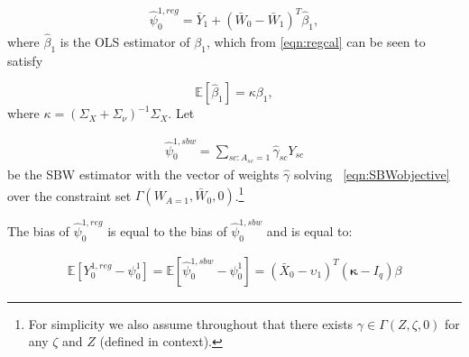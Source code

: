 \begin{align*}
\hat{\psi}^{1, reg}_0 = \bar{Y}_1 + (\bar{W}_0 - \bar{W}_1)^T\hat{\beta}_1,
\end{align*}
%
where $\hat{\beta}_1$ is the OLS estimator of $\beta_1$, which from \eqref{eqn:regcal} can be seen to satisfy \citep{gleser1992importance}

\begin{equation*}
    \mathbb{E}[\hat{\beta}_1] = \kappa \beta_1,
\end{equation*}
where $\kappa = (\Sigma_{X} + \Sigma_{\nu})^{-1} \Sigma_{X}.$ Let 

\begin{align*}
\hat{\psi}^{1, sbw}_0 = \sum_{sc: A_{sc} = 1} \hat{\gamma}_{sc} Y_{sc}
\end{align*}
%
be the SBW estimator with the vector of weights $\hat{\gamma}$ solving ~\eqref{eqn:SBWobjective} over the constraint set $\Gamma(W_{A=1}, \bar{W}_0, 0)$.\footnote{For simplicity we also assume throughout that there exists $\gamma \in \Gamma(Z, \zeta, 0)$ for any $\zeta$ and $Z$ (defined in context).}

\begin{proposition}\label{cl1}
The bias of $\hat{\psi}^{1, reg}_0$ is equal to the bias of $\hat{\psi}^{1, sbw}_0$ and is equal to: 

\begin{align*}
\mathbb{E}[Y^{1, reg}_0 - \psi^1_0] = \mathbb{E}[\hat{\psi}^{1, sbw}_0 - \psi^1_0] = (\bar{X}_0 - \upsilon_1)^T(\mathbf{\kappa} - I_q)\beta
\end{align*}
\end{proposition}

